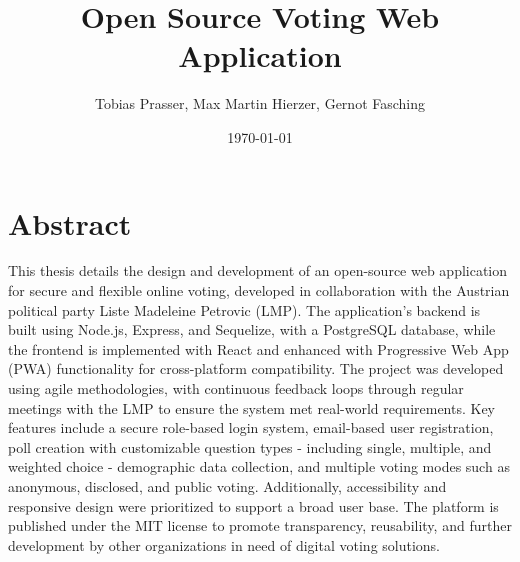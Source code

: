 \documentclass[a4paper,12pt]{report}
\begin{document}
\title{Open Source Voting Web Application}
\author{Tobias Prasser, Max Martin Hierzer, Gernot Fasching}
\date{\today}
\maketitle

\chapter*{Abstract}
This thesis details the design and development of an open-source web application for secure and flexible online voting, developed in collaboration with the Austrian political party Liste Madeleine Petrovic (LMP). The application’s backend is built using Node.js, Express, and Sequelize, with a PostgreSQL database, while the frontend is implemented with React and enhanced with Progressive Web App (PWA) functionality for cross-platform compatibility. The project was developed using agile methodologies, with continuous feedback loops through regular meetings with the LMP to ensure the system met real-world requirements. Key features include a secure role-based login system, email-based user registration, poll creation with customizable question types - including single, multiple, and weighted choice - demographic data collection, and multiple voting modes such as anonymous, disclosed, and public voting. Additionally, accessibility and responsive design were prioritized to support a broad user base. The platform is published under the MIT license to promote transparency, reusability, and further development by other organizations in need of digital voting solutions.
\newpage

\end{document}
